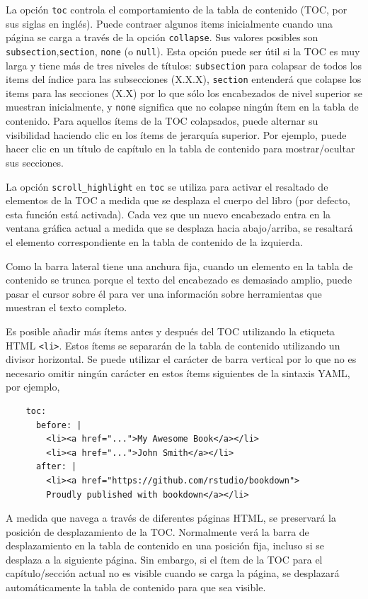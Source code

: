 \documentclass[12pt,]{krantz}
\theoremstyle{definition}
\theoremstyle{definition}
\theoremstyle{definition}
\theoremstyle{remark}
\begin{document}
La opción \texttt{toc} controla el comportamiento de la tabla de
contenido (TOC, por sus siglas en inglés). Puede contraer algunos items
inicialmente cuando una página se carga a través de la opción
\texttt{collapse}. Sus valores posibles son
\texttt{subsection},\texttt{section}, \texttt{none} (o \texttt{null}).
Esta opción puede ser útil si la TOC es muy larga y tiene más de tres
niveles de títulos: \texttt{subsection} para colapsar de todos los items
del índice para las subsecciones (X.X.X), \texttt{section} entenderá que
colapse los items para las secciones (X.X) por lo que sólo los
encabezados de nivel superior se muestran inicialmente, y \texttt{none}
significa que no colapse ningún ítem en la tabla de contenido. Para
aquellos ítems de la TOC colapsados, puede alternar su visibilidad
haciendo clic en los ítems de jerarquía superior. Por ejemplo, puede
hacer clic en un título de capítulo en la tabla de contenido para
mostrar/ocultar sus secciones.

La opción \texttt{scroll\_highlight} en \texttt{toc} se utiliza para
activar el resaltado de elementos de la TOC a medida que se desplaza el
cuerpo del libro (por defecto, esta función está activada). Cada vez que
un nuevo encabezado entra en la ventana gráfica actual a medida que se
desplaza hacia abajo/arriba, se resaltará el elemento correspondiente en
la tabla de contenido de la izquierda.

Como la barra lateral tiene una anchura fija, cuando un elemento en la
tabla de contenido se trunca porque el texto del encabezado es demasiado
amplio, puede pasar el cursor sobre él para ver una información sobre
herramientas que muestran el texto completo.

Es posible añadir más ítems antes y después del TOC utilizando la
etiqueta HTML \texttt{\textless{}li\textgreater{}}. Estos ítems se
separarán de la tabla de contenido utilizando un divisor horizontal. Se
puede utilizar el carácter de barra vertical \texttt{\textbar{}} por lo
que no es necesario omitir ningún carácter en estos ítems siguientes de
la sintaxis YAML, por ejemplo,

\begin{verbatim}
    toc:
      before: |
        <li><a href="...">My Awesome Book</a></li>
        <li><a href="...">John Smith</a></li>
      after: |
        <li><a href="https://github.com/rstudio/bookdown">
        Proudly published with bookdown</a></li>
\end{verbatim}

A medida que navega a través de diferentes páginas HTML, se preservará
la posición de desplazamiento de la TOC. Normalmente verá la barra de
desplazamiento en la tabla de contenido en una posición fija, incluso si
se desplaza a la siguiente página. Sin embargo, si el ítem de la TOC
para el capítulo/sección actual no es visible cuando se carga la página,
se desplazará automáticamente la tabla de contenido para que sea
visible.
\end{document}
